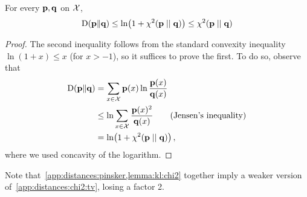 \begin{lemma}
  \label{lemma:kl:chi2}
For every $\mathbf{p},\mathbf{q}$ on $\mathcal{X}$, 
\[
  \kldiv{\p}{\q} \leq \ln(1+\chisquare{\p}{\q}) \leq \chisquare{\p}{\q}
\]
\end{lemma}
\begin{proof}
  The second inequality follows from the standard convexity inequality $\ln(1+x) \leq x$ (for $x>-1$), so it suffices to prove the first. To do so, observe that
  \begin{align*}
      \kldiv{\p}{\q} 
      &= \sum_{x\in\domain} \p(x)\ln\frac{\p(x)}{\q(x)} \\
      &\leq \ln\sum_{x\in\domain}\frac{\p(x)^2}{\q(x)} \tag{Jensen's inequality}\\
      &= \ln(1+\chisquare{\p}{\q})\,,
  \end{align*}
  where we used concavity of the logarithm.
\end{proof}
\noindent Note that~\cref{app:distances:pinsker,lemma:kl:chi2} together imply a weaker version of~\cref{app:distances:chi2:tv}, losing a factor 2.